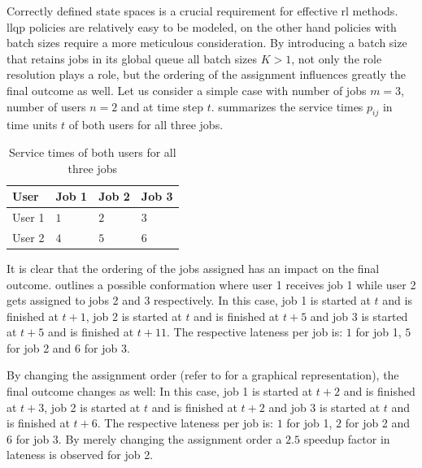 Correctly defined state spaces is a crucial requirement for effective \gls{rl} methods. \gls{llqp} policies are relatively easy to be modeled, on the other hand policies with batch sizes require a more meticulous consideration. By introducing a batch size that retains jobs in its global queue \ie all batch sizes $K>1$, not only the role resolution plays a role, but the ordering of the assignment influences greatly the final outcome as well. Let us consider a simple case with number of jobs $m=3$, number of users $n=2$ and at time step $t$.  summarizes the service times $p_{ij}$ in time units $t$ of both users for all three jobs.

\begin{table}[!ht]
	\centering
		\begin{tabular}{@{}llll@{}}
		\toprule
		User   & Job 1 & Job 2 & Job 3 \\ \midrule
		User 1 & $1$     & $2$     & $3$     \\
		User 2 & $4$     & $5$     & $6$     \\ \bottomrule
		\end{tabular}
	\caption{Service times of both users for all three jobs}
	\label{tab:users_service_times_example}
\end{table}

It is clear that the ordering of the jobs assigned has an impact on the final outcome.  outlines a possible conformation where user 1 receives job 1 while user 2 gets assigned to jobs 2 and 3 respectively. In this case, job 1 is started at $t$ and is finished at $t+1$, job 2 is started at $t$ and is finished at $t+5$ and job 3 is started at $t+5$ and is finished at $t+11$. The respective lateness per job is: $1$ for job 1, $5$ for job 2 and $6$ for job $3$.

By changing the assignment order (refer to  for a graphical representation), the final outcome changes as well: In this case, job 1 is started at $t+2$ and is finished at $t+3$, job 2 is started at $t$ and is finished at $t+2$ and job 3 is started at $t$ and is finished at $t+6$. The respective lateness per job is: $1$ for job 1, $2$ for job 2 and $6$ for job $3$. By merely changing the assignment order a $2.5$ speedup factor in lateness is observed for job 2.

